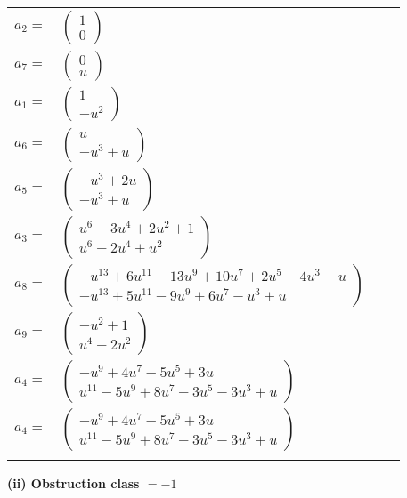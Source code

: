 \documentclass[1p]{elsarticle_modified}
\theoremstyle{definition}
\begin{document}
\begin{tabular}{m{7pt} m{180pt} m{7pt} m{180pt} }
\flushright $a_{2}=$&$\begin{pmatrix}1\\0\end{pmatrix}$ \\
\flushright $a_{7}=$&$\begin{pmatrix}0\\u\end{pmatrix}$ \\
\flushright $a_{1}=$&$\begin{pmatrix}1\\- u^2\end{pmatrix}$ \\
\flushright $a_{6}=$&$\begin{pmatrix}u\\- u^3+u\end{pmatrix}$ \\
\flushright $a_{5}=$&$\begin{pmatrix}- u^3+2 u\\- u^3+u\end{pmatrix}$ \\
\flushright $a_{3}=$&$\begin{pmatrix}u^6-3 u^4+2 u^2+1\\u^6-2 u^4+u^2\end{pmatrix}$ \\
\flushright $a_{8}=$&$\begin{pmatrix}- u^{13}+6 u^{11}-13 u^9+10 u^7+2 u^5-4 u^3- u\\- u^{13}+5 u^{11}-9 u^9+6 u^7- u^3+u\end{pmatrix}$ \\
\flushright $a_{9}=$&$\begin{pmatrix}- u^2+1\\u^4-2 u^2\end{pmatrix}$ \\
\flushright $a_{4}=$&$\begin{pmatrix}- u^9+4 u^7-5 u^5+3 u\\u^{11}-5 u^9+8 u^7-3 u^5-3 u^3+u\end{pmatrix}$\\ \flushright $a_{4}=$&$\begin{pmatrix}- u^9+4 u^7-5 u^5+3 u\\u^{11}-5 u^9+8 u^7-3 u^5-3 u^3+u\end{pmatrix}$\\&\end{tabular}
\flushleft \textbf{(ii) Obstruction class $= -1$}\\~\\
\end{document}
